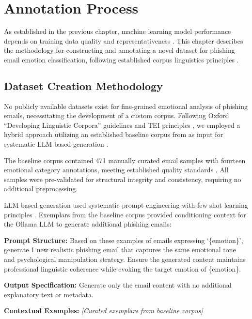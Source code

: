 \chapter{Annotation Process}
\label{chapter:dataset}

As established in the previous chapter, machine learning model performance depends on training data quality and representativeness \cite{vapnik1995nature}. This chapter describes the methodology for constructing and annotating a novel dataset for phishing email emotion classification, following established corpus linguistics principles \cite{mcenery2011corpus}.

\section{Dataset Creation Methodology}

No publicly available datasets exist for fine-grained emotional analysis of phishing emails, necessitating the development of a custom corpus. Following Oxford ``Developing Linguistic Corpora'' guidelines \cite{ota2023guidelines} and TEI principles \cite{tei2023guidelines}, we employed a hybrid approach utilizing an established baseline corpus from \cite{Fernandes2024} as input for systematic LLM-based generation \cite{baroni2009web}.

The baseline corpus contained 471 manually curated email samples with fourteen emotional category annotations, meeting established quality standards \cite{hunston2002corpora}. All samples were pre-validated for structural integrity and consistency, requiring no additional preprocessing.

LLM-based generation used systematic prompt engineering with few-shot learning principles \cite{brown2020language,shirazi2023adversarial}. Exemplars from the baseline corpus provided conditioning context for the Ollama LLM to generate additional phishing emails:

\begin{tcolorbox}[colback=gray!10, colframe=gray!60, title={Standardized Prompt Template for LLM-based Generation}]
\textbf{Prompt Structure:} Based on these examples of emails expressing `\{emotion\}', generate 1 new realistic phishing email that captures the same emotional tone and psychological manipulation strategy. Ensure the generated content maintains professional linguistic coherence while evoking the target emotion of \{emotion\}.

\textbf{Output Specification:} Generate only the email content with no additional explanatory text or metadata.

\textbf{Contextual Examples:} \textit{[Curated exemplars from baseline corpus]}
\end{tcolorbox}

